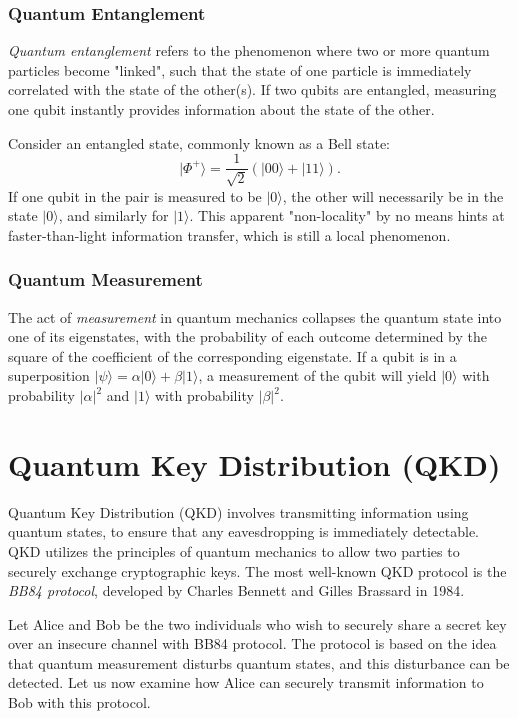\documentclass{article}
\begin{document}
\subsubsection*{Quantum Entanglement}

\textit{Quantum entanglement} refers to the phenomenon where two or more quantum particles become "linked", such that the state of one particle is immediately correlated with the state of the other(s). If two qubits are entangled, measuring one qubit instantly provides information about the state of the other.

Consider an entangled state, commonly known as a Bell state:
\[
|\Phi^+\rangle = \frac{1}{\sqrt{2}} \left( |00\rangle + |11\rangle \right).
\]
If one qubit in the pair is measured to be \( |0\rangle \), the other will necessarily be in the state \( |0\rangle \), and similarly for \( |1\rangle \). This apparent "non-locality" by no means hints at faster-than-light information transfer, which is still a local phenomenon. 

\subsubsection*{Quantum Measurement}

The act of \textit{measurement} in quantum mechanics collapses the quantum state into one of its eigenstates, with the probability of each outcome determined by the square of the coefficient of the corresponding eigenstate. If a qubit is in a superposition \( |\psi\rangle = \alpha |0\rangle + \beta |1\rangle \), a measurement of the qubit will yield \( |0\rangle \) with probability \( |\alpha|^2 \) and \( |1\rangle \) with probability \( |\beta|^2 \).


\section*{Quantum Key Distribution (QKD)}

Quantum Key Distribution (QKD) involves transmitting information using quantum states, to ensure that any eavesdropping is immediately detectable.  QKD utilizes the principles of quantum mechanics to allow two parties to securely exchange cryptographic keys. The most well-known QKD protocol is the \textit{BB84 protocol}, developed by Charles Bennett and Gilles Brassard in 1984. 

Let Alice and Bob be the two individuals who wish to securely share a secret key over an insecure channel with BB84 protocol. The protocol is based on the idea that quantum measurement disturbs quantum states, and this disturbance can be detected. Let us now examine how Alice can securely transmit information to Bob with this protocol.
\end{document}
